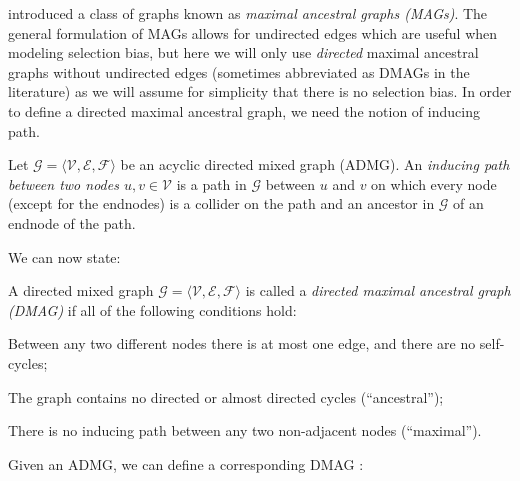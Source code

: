 \documentclass[twoside,11pt]{article}
\newcommand\C[1]{\mathcal{#1}}
\begin{document}
\citet{RichardsonSpirtes02} introduced a class of graphs known as \emph{maximal ancestral graphs (MAGs)}.
The general formulation of MAGs allows for undirected edges which are useful when modeling selection bias, but here we will only use \emph{directed} maximal ancestral graphs without undirected edges (sometimes abbreviated as DMAGs in the literature) as we will assume for simplicity that there is no selection bias.
In order to define a directed maximal ancestral graph, we need the notion of inducing path.
\begin{definition}
Let $\C{G} = \langle \C{V}, \C{E}, \C{F} \rangle$ be an acyclic directed mixed graph (ADMG). 
An \emph{inducing path between two nodes $u,v \in \C{V}$} is a path in $\C{G}$ between $u$ and $v$ on which every node 
(except for the endnodes) is a collider on the path and an ancestor in $\C{G}$ of an endnode of the path.
\end{definition}
We can now state:
\begin{definition}
  A directed mixed graph $\C{G} = \langle \C{V}, \C{E}, \C{F} \rangle$ is called a \emph{directed maximal ancestral graph (DMAG)} if all of the following conditions hold: 
  \begin{compactenum}
    \item Between any two different nodes there is at most one edge, and there are no self-cycles;
    \item The graph contains no directed or almost directed cycles (``ancestral'');
    \item There is no inducing path between any two non-adjacent nodes (``maximal'').
  \end{compactenum}
\end{definition}
Given an ADMG, we can define a corresponding DMAG \citep{RichardsonSpirtes02}:
\end{document}
